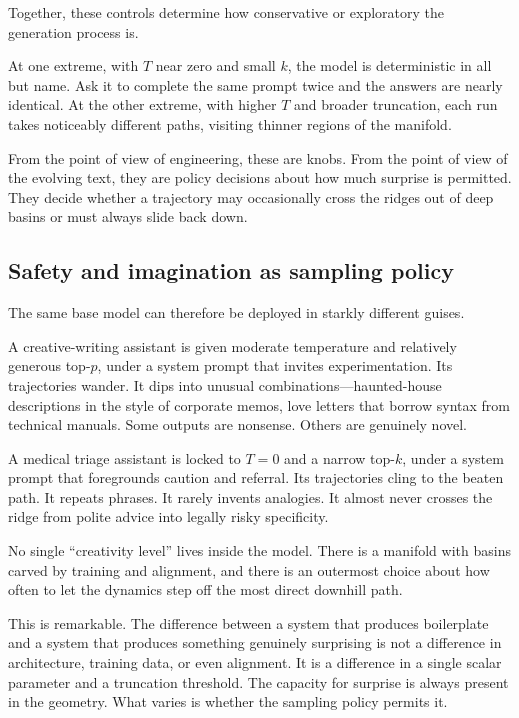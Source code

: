 Together, these controls determine how conservative or exploratory the generation process is.

At one extreme, with $T$ near zero and small $k$, the model is deterministic in all but name. Ask it to complete the same prompt twice and the answers are nearly identical. At the other extreme, with higher $T$ and broader truncation, each run takes noticeably different paths, visiting thinner regions of the manifold.

From the point of view of engineering, these are knobs. From the point of view of the evolving text, they are policy decisions about how much surprise is permitted. They decide whether a trajectory may occasionally cross the ridges out of deep basins or must always slide back down.

\subsection*{Safety and imagination as sampling policy}

The same base model can therefore be deployed in starkly different guises.

A creative-writing assistant is given moderate temperature and relatively generous top-$p$, under a system prompt that invites experimentation. Its trajectories wander. It dips into unusual combinations---haunted-house descriptions in the style of corporate memos, love letters that borrow syntax from technical manuals. Some outputs are nonsense. Others are genuinely novel.

A medical triage assistant is locked to $T=0$ and a narrow top-$k$, under a system prompt that foregrounds caution and referral. Its trajectories cling to the beaten path. It repeats phrases. It rarely invents analogies. It almost never crosses the ridge from polite advice into legally risky specificity.

No single ``creativity level'' lives inside the model. There is a manifold with basins carved by training and alignment, and there is an outermost choice about how often to let the dynamics step off the most direct downhill path.

This is remarkable. The difference between a system that produces boilerplate and a system that produces something genuinely surprising is not a difference in architecture, training data, or even alignment. It is a difference in a single scalar parameter and a truncation threshold. The capacity for surprise is always present in the geometry. What varies is whether the sampling policy permits it.

